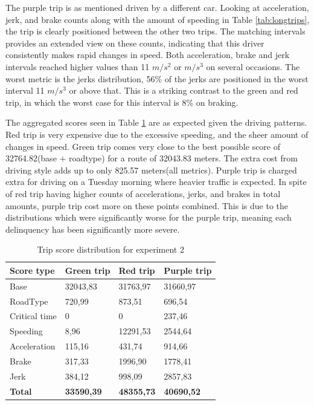 The purple trip is as mentioned driven by a different car. Looking at acceleration, jerk, and brake counts along with the amount of speeding in Table \ref{tab:longtrips}, the trip is clearly positioned between the other two trips. The matching intervals provides an extended view on these counts, indicating that this driver consistently makes rapid changes in speed. Both acceleration, brake and jerk intervals reached higher values than 11 $m/s^2$ or $m/s^3$ on several occasions. The worst metric is the jerks distribution, 56\% of the jerks are positioned in the worst interval 11 $m/s^3$ or above that. This is a striking contrast to the green and red trip, in which the worst case for this interval is 8\% on braking.

The aggregated scores seen in Table \ref{tab:longtripscores} are as expected given the driving patterns. Red trip is very expensive due to the excessive speeding, and the sheer amount of changes in speed. Green trip comes very close to the best possible score of 32764.82(base $+$ roadtype) for a route of 32043.83 meters. The extra cost from driving style adds up to only 825.57 meters(all metrics). Purple trip is charged extra for driving on a Tuesday morning where heavier traffic is expected. In spite of red trip having higher counts of accelerations, jerks, and brakes in total amounts, purple trip cost more on these points combined. This is due to the distributions which were significantly worse for the purple trip, meaning each delinquency has been significantly more severe.

\begin{table}
    \centering
    \begin{tabular}{llll}
    \textbf{Score type} & \textbf{Green trip} & \textbf{Red trip} & \textbf{Purple trip}\\ \hline
    Base                & 32043,83            & 31763,97          & 31660,97            \\
    RoadType            & 720,99              & 873,51            & 696,54              \\
    Critical time       & 0                   & 0                 & 237,46              \\
    Speeding            & 8,96                & 12291,53          & 2544,64             \\
    Acceleration        & 115,16              & 431,74            & 914,66              \\
    Brake               & 317,33              & 1996,90           & 1778,41             \\
    Jerk                & 384,12              & 998,09            & 2857,83             \\ \hline
    \textbf{Total}      & \textbf{33590,39}   & \textbf{48355,73} & \textbf{40690,52}   \\ \hline
    \end{tabular}
    \caption{Trip score distribution for experiment 2}
    \label{tab:longtripscores}
\end{table}

